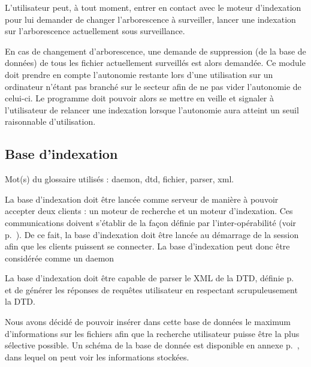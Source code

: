 L'utilisateur peut, à tout moment, entrer en contact avec le moteur d'indexation pour lui demander de changer l'arborescence à surveiller, lancer une indexation sur l'arborescence actuellement sous surveillance.

En cas de changement d'arborescence, une demande de suppression (de la base de données) de tous les fichier actuellement surveillés est alors demandée.
Ce module doit prendre en compte l'autonomie restante lors d'une utilisation sur un ordinateur n'étant pas branché sur le secteur afin de ne pas vider l'autonomie de celui-ci. Le programme doit pouvoir alors se mettre en veille et signaler à l'utilisateur de relancer une indexation lorsque l'autonomie aura atteint un seuil raisonnable d'utilisation.

\subsection{Base d'indexation}
Mot(s) du glossaire utilisés : \gls{daemon}, \gls{dtd}, \gls{fichier}, \gls{parser}, \gls{xml}.

La base d'indexation doit être lancée comme serveur de manière à pouvoir accepter deux clients : un moteur de recherche et un moteur d'indexation. Ces communications doivent s'établir de la façon définie par l'inter-opérabilité (voir p.~\pageref{inter_operabilite}). De ce fait, la base d'indexation doit être lancée au démarrage de la session afin que les clients puissent se connecter. La base d'indexation peut donc être considérée comme un daemon

La base d'indexation doit être capable de parser le XML de la DTD, définie p.~\pageref{dtd} et de générer les réponses de requêtes utilisateur en respectant scrupuleusement la DTD.

Nous avons décidé de pouvoir insérer dans cette base de données le maximum d'informations sur les fichiers afin que la recherche utilisateur puisse être la plus sélective possible. Un schéma de la base de donnée est disponible en annexe p.~\pageref{bdd}, dans lequel on peut voir les informations stockées.

